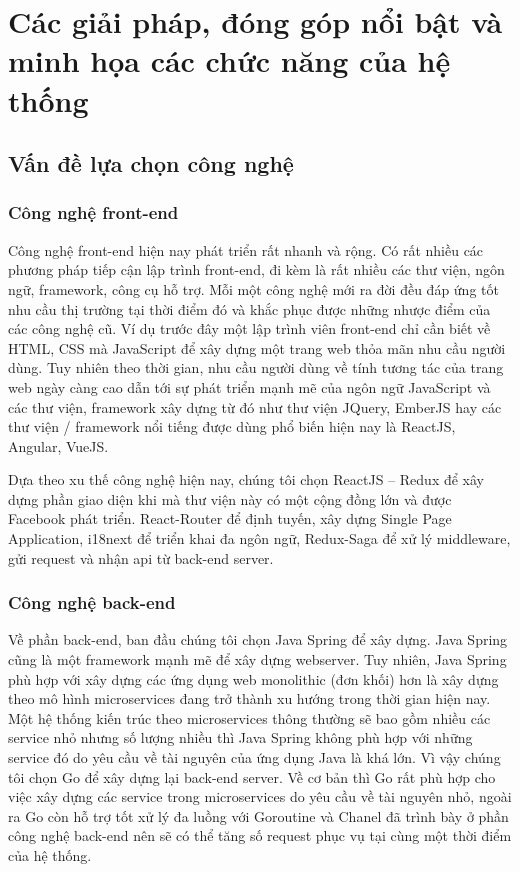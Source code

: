 \chapter{Các giải pháp, đóng góp nổi bật và minh họa các
chức năng của hệ thống}
\section{Vấn đề lựa chọn công nghệ}
\subsection{Công nghệ front-end}
Công nghệ front-end hiện nay phát triển rất nhanh và rộng.
Có rất nhiều các phương pháp tiếp cận lập trình front-end, đi kèm
là rất nhiều các thư viện, ngôn ngữ, framework,
công cụ hỗ trợ. Mỗi một công nghệ mới ra đời đều đáp ứng
tốt nhu cầu thị trường tại thời điểm đó và
khắc phục được những nhược điểm của các công nghệ cũ.
Ví dụ trước đây một lập trình viên front-end chỉ cần
biết về HTML, CSS mà JavaScript để xây dựng một trang web
thỏa mãn nhu cầu người dùng. Tuy nhiên theo thời gian, nhu cầu
người dùng về tính tương tác của trang web ngày càng cao dẫn
tới sự phát triển mạnh mẽ của ngôn ngữ JavaScript và các thư viện,
framework xây dựng từ đó như thư viện JQuery, EmberJS hay các
thư viện / framework nổi tiếng được dùng phổ biến hiện nay là
ReactJS, Angular, VueJS.

Dựa theo xu thế công nghệ hiện nay, chúng tôi chọn ReactJS – Redux để
xây dựng phần giao diện khi mà thư viện này có một cộng đồng lớn
và được Facebook phát triển. React-Router để định tuyến, xây dựng
Single Page Application, i18next để triển khai đa ngôn ngữ,
Redux-Saga để xử lý middleware,
gửi request và nhận api từ back-end server. 

\subsection{Công nghệ back-end}
Về phần back-end, ban đầu chúng tôi chọn Java Spring để xây dựng.
Java Spring cũng là một framework mạnh mẽ để xây dựng webserver.
Tuy nhiên, Java Spring phù hợp với xây dựng các ứng dụng web
monolithic (đơn khối) hơn là xây dựng theo mô hình microservices
đang trở thành xu hướng trong thời gian hiện nay. Một
hệ thống kiến trúc theo microservices thông thường sẽ
bao gồm nhiều các service nhỏ nhưng số lượng nhiều thì Java
Spring không phù hợp với những service đó do yêu cầu về tài
nguyên của ứng dụng Java là khá lớn. Vì vậy chúng tôi chọn
Go để xây dựng lại back-end server. Về cơ bản thì Go rất
phù hợp cho việc xây dựng các service trong microservices
do yêu cầu về tài nguyên nhỏ, ngoài ra Go còn hỗ trợ tốt xử
lý đa luồng với Goroutine và Chanel đã trình bày ở phần
công nghệ back-end nên
sẽ có thể tăng số request phục vụ tại cùng một thời điểm của hệ thống.

